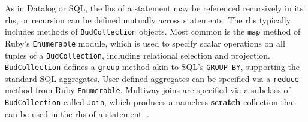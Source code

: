 As in Datalog or SQL, the lhs of a statement may be referenced recursively in its rhs, or recursion can be defined mutually across statements.  The rhs typically includes methods of \texttt{BudCollection} objects.  
Most common is the \texttt{map} method of Ruby's \texttt{Enumerable} module, which is used to specify scalar operations on all tuples of a \texttt{BudCollection}, including relational selection and projection.    \texttt{BudCollection} defines a \texttt{group} method akin to SQL's \texttt{GROUP BY}, supporting the standard SQL aggregates.   User-defined aggregates can be specified via a \texttt{reduce} method from Ruby \texttt{Enumerable}.  Multiway joins are specified via a subclass of \texttt{BudCollection} called \texttt{Join}, which produces a nameless \textbf{scratch} collection that can be used in the rhs of a statement. .


